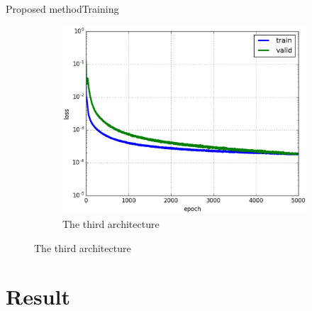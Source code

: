 \documentclass[10pt]{beamer}
\begin{document}
\begin{frame}{Proposed method}{Training}
\begin{figure}[htbp]
\begin{subfigure}[t]{0.5\textwidth}
        			\includegraphics[scale=.22]{images/loss_model_3}
        			\caption{\scriptsize{The third architecture }}
        			\label{figsub22}
    			\end{subfigure}    		
			\end{figure}
\end{frame}

\section{Result}
\end{document}
